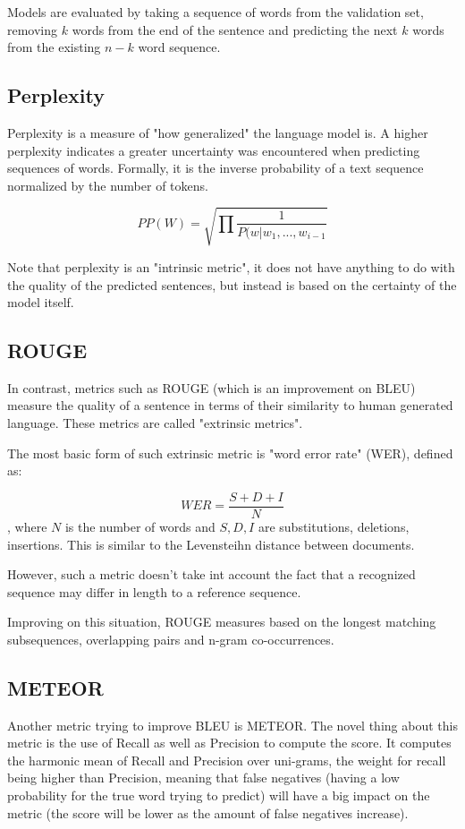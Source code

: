 \documentclass[a4paper]{article}
\begin{document}
Models are evaluated by taking a sequence
of words from the validation set, removing
$k$ words from the end of the sentence and predicting
the next $k$ words from the existing $n - k$ word sequence.

\subsection{Perplexity}
\label{sec:perplexity}

Perplexity is a measure of "how generalized" the language
model is. A higher perplexity indicates a greater uncertainty
was encountered when predicting sequences of words. Formally,
it is the inverse probability of a text sequence normalized
by the number of tokens.

$$ PP(W) = \sqrt{\prod \frac{1}{P(w|w_1, ..., w_{i - 1}}} $$

Note that perplexity is an "intrinsic metric", it does not
have anything to do with the quality of the predicted
sentences, but instead is based on the certainty of the
model itself.

\subsection{ROUGE}
\label{sec:rouge}

In contrast, metrics such as ROUGE (which is an improvement
on BLEU) measure the quality of a sentence in terms of
their similarity to human generated language. These metrics
are called "extrinsic metrics".

The most basic form of such extrinsic metric is "word error
rate" (WER), defined as:

$$ WER = \frac{S + D + I}{N} $$, where $N$ is the number of
words and $S, D, I$ are substitutions, deletions, insertions.
This is similar to the Levensteihn distance between documents.

However, such a metric doesn't take int account the fact that
a recognized sequence may differ in length to a reference
sequence.

Improving on this situation, ROUGE measures based on the
longest matching subsequences, overlapping pairs and n-gram
co-occurrences.

\subsection{METEOR}
\label{sec:meteor}
Another metric trying to improve BLEU is
METEOR. The novel thing about this metric is the use of Recall as well as
Precision to compute the score. It computes the harmonic mean of Recall and
Precision over uni-grams, the weight for recall being higher than Precision,
meaning that false negatives (having a low probability for the true word trying
to predict) will have a big impact on the metric (the score will be lower as the
amount of false negatives increase).
\end{document}
